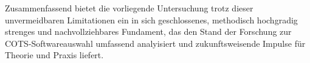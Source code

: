 Zusammenfassend bietet die vorliegende Untersuchung trotz dieser unvermeidbaren Limitationen ein in sich geschlossenes, methodisch hochgradig strenges und nachvollziehbares Fundament, das den Stand der Forschung zur COTS-Softwareauswahl umfassend analyisiert und zukunftsweisende Impulse für Theorie und Praxis liefert.

